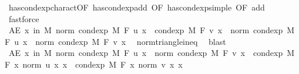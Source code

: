 \begin{isabellebody}
\ has{\isacharunderscore}{\kern0pt}cond{\isacharunderscore}{\kern0pt}exp{\isacharunderscore}{\kern0pt}charact{\isacharparenleft}{\kern0pt}{}{\isacharparenright}{\kern0pt}{\isacharbrackleft}{\kern0pt}OF\ has{\isacharunderscore}{\kern0pt}cond{\isacharunderscore}{\kern0pt}exp{\isacharunderscore}{\kern0pt}add{\isacharcomma}{\kern0pt}\ OF\ has{\isacharunderscore}{\kern0pt}cond{\isacharunderscore}{\kern0pt}exp{\isacharunderscore}{\kern0pt}simple{\isacharparenleft}{\kern0pt}{}{\isacharcomma}{\kern0pt}{}{\isacharparenright}{\kern0pt}{\isacharcomma}{\kern0pt}\ OF\ add{\isacharparenleft}{\kern0pt}{}{\isacharcomma}{\kern0pt}{}{\isacharcomma}{\kern0pt}{}{\isacharcomma}{\kern0pt}{}{\isacharparenright}{\kern0pt}{\isacharbrackright}{\kern0pt}\ \isamarkupfalse%
\ fastforce\isanewline
\ \ \isamarkupfalse%
\ \isamarkupfalse%
\ {\isachardoublequoteopen}AE\ x\ in\ M{\isachardot}{\kern0pt}\ norm\ {\isacharparenleft}{\kern0pt}cond{\isacharunderscore}{\kern0pt}exp\ M\ F\ u\ x\ {\isacharplus}{\kern0pt}\ cond{\isacharunderscore}{\kern0pt}exp\ M\ F\ v\ x{\isacharparenright}{\kern0pt}\ {\isasymle}\ norm\ {\isacharparenleft}{\kern0pt}cond{\isacharunderscore}{\kern0pt}exp\ M\ F\ u\ x{\isacharparenright}{\kern0pt}\ {\isacharplus}{\kern0pt}\ norm\ {\isacharparenleft}{\kern0pt}cond{\isacharunderscore}{\kern0pt}exp\ M\ F\ v\ x{\isacharparenright}{\kern0pt}{\isachardoublequoteclose}\ \isamarkupfalse%
\ norm{\isacharunderscore}{\kern0pt}triangle{\isacharunderscore}{\kern0pt}ineq\ \isamarkupfalse%
\ blast\isanewline
\ \ \isamarkupfalse%
\ \isamarkupfalse%
\ {\isachardoublequoteopen}AE\ x\ in\ M{\isachardot}{\kern0pt}\ norm\ {\isacharparenleft}{\kern0pt}cond{\isacharunderscore}{\kern0pt}exp\ M\ F\ u\ x{\isacharparenright}{\kern0pt}\ {\isacharplus}{\kern0pt}\ norm\ {\isacharparenleft}{\kern0pt}cond{\isacharunderscore}{\kern0pt}exp\ M\ F\ v\ x{\isacharparenright}{\kern0pt}\ {\isasymle}\ cond{\isacharunderscore}{\kern0pt}exp\ M\ F\ {\isacharparenleft}{\kern0pt}{\isasymlambda}x{\isachardot}{\kern0pt}\ norm\ {\isacharparenleft}{\kern0pt}u\ x{\isacharparenright}{\kern0pt}{\isacharparenright}{\kern0pt}\ x\ {\isacharplus}{\kern0pt}\ cond{\isacharunderscore}{\kern0pt}exp\ M\ F\ {\isacharparenleft}{\kern0pt}{\isasymlambda}x{\isachardot}{\kern0pt}\ norm\ {\isacharparenleft}{\kern0pt}v\ x{\isacharparenright}{\kern0pt}{\isacharparenright}{\kern0pt}\ x{\isachardoublequoteclose}\ \isamarkupfalse%

\end{isabellebody}
